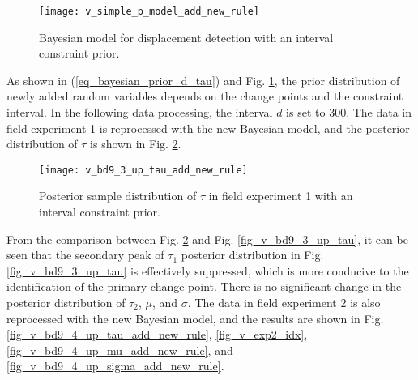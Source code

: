 \documentclass[final,3p,times]{elsarticle}
\begin{document}
	\begin{figure}[H]
		\centering
		\texttt{[image: v\_simple\_p\_model\_add\_new\_rule]}
		\caption{Bayesian model for displacement detection with an interval constraint prior.}
		\label{fig_v_simple_p_model_add_new_rule}
	\end{figure} 
	As shown in (\ref{eq_bayesian_prior_d_tau}) and Fig. \ref{fig_v_simple_p_model_add_new_rule}, the prior distribution of newly added random variables depends on the change points and the constraint interval. 
	In the following data processing, the interval $d$ is set to 300.
	The data in field experiment 1 is reprocessed with the new Bayesian model, and the posterior distribution of $\tau$ is shown in Fig. \ref{fig_v_bd9_3_up_tau_add_new_rule}.
	
	\begin{figure}[htbp]
		\centering
		\texttt{[image: v\_bd9\_3\_up\_tau\_add\_new\_rule]}
		\caption{Posterior sample distribution of $\tau$ in field experiment 1 with an interval constraint prior.}
		\label{fig_v_bd9_3_up_tau_add_new_rule}
	\end{figure} 
	
	From the comparison between Fig. \ref{fig_v_bd9_3_up_tau_add_new_rule} and Fig. \ref{fig_v_bd9_3_up_tau}, it can be seen that the secondary peak of $\tau_1$ posterior distribution in Fig. \ref{fig_v_bd9_3_up_tau} is effectively suppressed, which is more conducive to the identification of the primary change point. 
	There is no significant change in the posterior distribution of $\tau_2$, $\mu$, and  $\sigma$.
	The data in field experiment 2 is also reprocessed with the new Bayesian model, and the results are shown in Fig. \ref{fig_v_bd9_4_up_tau_add_new_rule}, \ref{fig_v_exp2_idx}, \ref{fig_v_bd9_4_up_mu_add_new_rule}, and \ref{fig_v_bd9_4_up_sigma_add_new_rule}.
	
\end{document}
